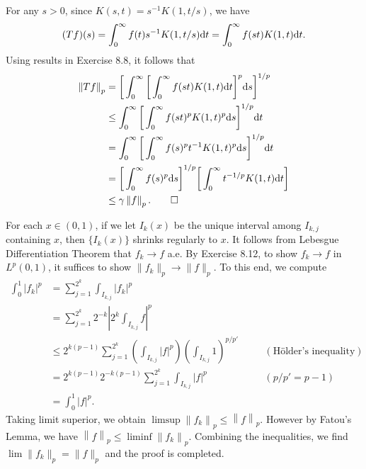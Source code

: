\begin{exercise}{9.8}
  For any $s> 0$, since $K(s,t)=s^{-1}K(1,t/s)$, we have
  \[
    (Tf)(s)=\int_0^\infty f(t)s^{-1}K(1,t/s)\mathrm{d} t=\int_0^\infty f(st)K(1,t)\mathrm{d} t.
  \]
  Using results in Exercise 8.8, it follows that
  \begin{align*}
     \left\|Tf\right\|_p&=\bigg[\int_0^\infty\bigg[\int_0^\infty f(st)K(1,t)\mathrm{d} t\bigg]^p\mathrm{d} s\bigg]^{1/p}\\
     &\leq \int_0^\infty\bigg[\int_0^\infty f(st)^p K(1,t)^p\mathrm{d} s\bigg]^{1/p}\mathrm{d} t\\
     &=\int_0^\infty\bigg[\int_0^\infty f(s)^p t^{-1}K(1,t)^p\mathrm{d} s\bigg]^{1/p}\mathrm{d} t\\
     &=\bigg[\int_0^\infty f(s)^p\mathrm{d} s\bigg]^{1/p}\bigg[\int_0^\infty t^{-1/p}K(1,t)\mathrm{d} t\bigg]\\
     &\leq\gamma\left\|f\right\|_p.
     \qedhere
  \end{align*}
\end{exercise}

\begin{exercise}{9.13}
  For each $x \in (0, 1)$,
  if we let $I_k(x)$ be the unique interval
  among $I_{k,j}$ containing $x$,
  then $\{I_k(x)\}$ shrinks regularly to $x$.
  It follows from Lebesgue Differentiation Theorem
  that $f_k \rightarrow f$ a.e.
  By Exercise 8.12, to show $f_k \rightarrow f$ in $L^p(0,1)$,
  it suffices to show $\|f_k\|_p \rightarrow \|f\|_p$.
  To this end, we compute
  \[
    \begin{aligned}
      \int_0^1 \left|f_k\right|^p
      &= \sum_{j=1}^{2^k} \int_{I_{k,j}} \left|f_k\right|^p \\
      &= \sum_{j=1}^{2^k} 2^{-k} \left| 2^k \int_{I_{k,j}} f \right|^p \\
      &\le 2^{k(p-1)} \sum_{j=1}^{2^k}
      \left( \int_{I_{k,j}} \left|f\right|^p \right)
      \left( \int_{I_{k,j}} 1 \right)^{p/p'}
      \quad &&(\text{H\"{o}lder's inequality}) \\
      &= 2^{k(p-1)} 2^{-k(p-1)}
      \sum_{j=1}^{2^k} \int_{I_{k,j}} \left|f\right|^p
      \quad &&(p/p' = p-1) \\
      &= \int_0^1 \left| f \right|^p.
    \end{aligned}
  \]
  Taking limit superior, we obtain
  $\limsup \left\| f_k \right\|_p \le \left\| f \right\|_p$.
  However by Fatou's Lemma, we have
  $\left\| f \right\|_p \le \liminf \left\| f_k \right\|_p$.
  Combining the inequalities, we find $\lim \|f_k\|_p = \|f\|_p$
  and the proof is completed.
\end{exercise}
